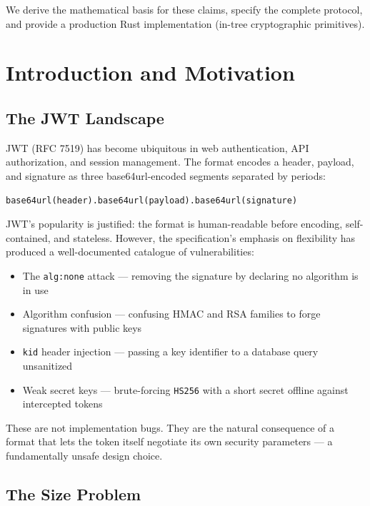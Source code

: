 \documentclass[11pt, letterpaper]{article}
\begin{document}
We derive the mathematical basis for these claims, specify the complete protocol,
and provide a production Rust implementation (in-tree cryptographic primitives).

\section{Introduction and Motivation}

\subsection{The JWT Landscape}

JWT (RFC 7519) has become ubiquitous in web authentication, API authorization,
and session management. The format encodes a header, payload, and signature
as three base64url-encoded segments separated by periods:

\begin{lstlisting}
base64url(header).base64url(payload).base64url(signature)
\end{lstlisting}

JWT's popularity is justified: the format is human-readable before encoding,
self-contained, and stateless. However, the specification's emphasis on
flexibility has produced a well-documented catalogue of vulnerabilities:

\begin{itemize}[noitemsep]
  \item The \texttt{alg:none} attack — removing the signature by declaring
        no algorithm is in use
  \item Algorithm confusion — confusing HMAC and RSA families to forge
        signatures with public keys
  \item \texttt{kid} header injection — passing a key identifier to a
        database query unsanitized
  \item Weak secret keys — brute-forcing \texttt{HS256} with a short secret
        offline against intercepted tokens
\end{itemize}

These are not implementation bugs. They are the natural consequence of a format
that lets the token itself negotiate its own security parameters — a
fundamentally unsafe design choice.

\subsection{The Size Problem}
\end{document}
